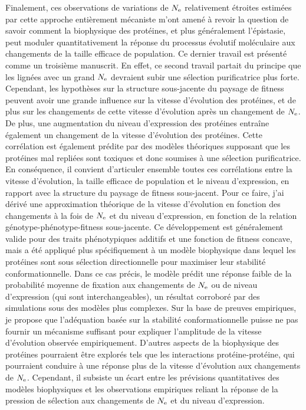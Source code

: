 Finalement, ces observations de variations de $N_{\textrm{e}}$ relativement étroites estimées par cette approche entièrement mécaniste m'ont amené à revoir la question de savoir comment la biophysique des protéines, et plus généralement l'épistasie, peut moduler quantitativement la réponse du processus évolutif moléculaire aux changements de la taille efficace de population.
Ce dernier travail est présenté comme un troisième manuscrit.
En effet, ce second travail partait du principe que les lignées avec un grand $N_{\textrm{e}}$ devraient subir une sélection purificatrice plus forte.
Cependant, les hypothèses sur la structure sous-jacente du paysage de fitness peuvent avoir une grande influence sur la vitesse d'évolution des protéines, et de plus sur les changements de cette vitesse d'évolution après un changement de $N_{\textrm{e}}$.
De plus, une augmentation du niveau d'expression des protéines entraîne également un changement de la vitesse d'évolution des protéines.
Cette corrélation est également prédite par des modèles théoriques supposant que les protéines mal repliées sont toxiques et donc soumises à une sélection purificatrice.
En conséquence, il convient d'articuler ensemble toutes ces corrélations entre la vitesse d'évolution, la taille efficace de population et le niveau d'expression, en rapport avec la structure du paysage de fitness sous-jacent.
Pour ce faire, j'ai dérivé une approximation théorique de la vitesse d'évolution en fonction des changements à la fois de $N_{\textrm{e}}$ et du niveau d'expression, en fonction de la relation génotype-phénotype-fitness sous-jacente.
Ce développement est généralement valide pour des traits phénotypiques additifs et une fonction de fitness concave, mais a été appliqué plus spécifiquement à un modèle biophysique dans lequel les protéines sont sous sélection directionnelle pour maximiser leur stabilité conformationnelle.
Dans ce cas précis, le modèle prédit une réponse faible de la probabilité moyenne de fixation aux changements de $N_{\textrm{e}}$ ou de niveau d'expression (qui sont interchangeables), un résultat corroboré par des simulations sous des modèles plus complexes.
Sur la base de preuves empiriques, je propose que l'adéquation basée sur la stabilité conformationnelle puisse ne pas fournir un mécanisme suffisant pour expliquer l'amplitude de la vitesse d'évolution observée empiriquement.
D'autres aspects de la biophysique des protéines pourraient être explorés tels que les interactions protéine-protéine, qui pourraient conduire à une réponse plus de la vitesse d'évolution aux changements de $N_{\textrm{e}}$.
Cependant, il subsiste un écart entre les prévisions quantitatives des modèles biophysiques et les observations empiriques reliant la réponse de la pression de sélection aux changements de $N_{\textrm{e}}$ et du niveau d'expression.

